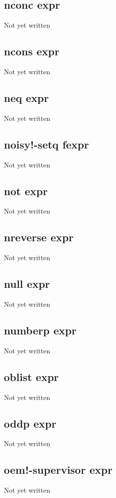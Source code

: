 \documentclass[a4paper,11pt]{article}
\begin{document}
{\subsection{\ttfamily nconc expr}
Not yet written

\subsection{\ttfamily ncons expr}
Not yet written

\subsection{\ttfamily neq expr}
Not yet written

\subsection{\ttfamily noisy!-setq fexpr}
Not yet written

\subsection{\ttfamily not expr}
Not yet written

\subsection{\ttfamily nreverse expr}
Not yet written

\subsection{\ttfamily null expr}
Not yet written

\subsection{\ttfamily numberp expr}
Not yet written

\subsection{\ttfamily oblist expr}
Not yet written

\subsection{\ttfamily oddp expr}
Not yet written

\subsection{\ttfamily oem!-supervisor expr}
Not yet written

}
\end{document}
